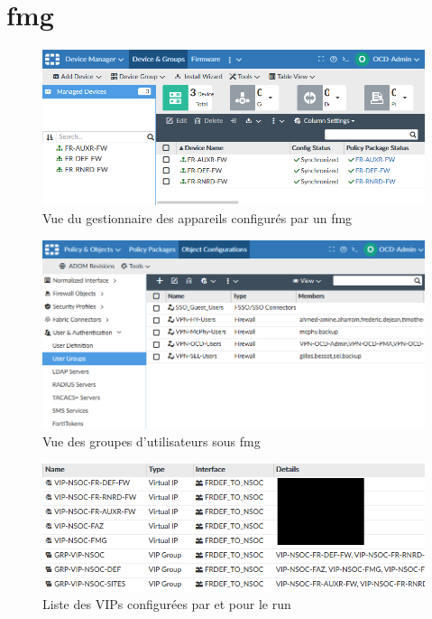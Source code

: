 \documentclass[12pt, oneside, a4paper, titlepage]{report}
\begin{document}
\section{\acrlong{fmg}}%
\label{sec:annexes::fmg}

\begin{figure}[h!]
    \centering
    \includegraphics[width = \linewidth]{img/fmg/device-manager.png}
    \caption{Vue du gestionnaire des appareils configurés par un \acrlong{fmg}}%
    \label{fig:fmg/device-manager.png}
\end{figure}

\begin{figure}[h!]
    \centering
    \includegraphics[width = \linewidth]{img/fmg/user-groups.png}
    \caption{Vue des groupes d'utilisateurs sous \acrlong{fmg}}%
    \label{fig:fmg/user-groups}
\end{figure}

\begin{figure}[h!]
    \centering
    \includegraphics[width = \linewidth]{img/fmg/vips.png}
    \caption{Liste des VIPs configurées par et pour le \gls{run}}%
    \label{fig:fmg/vips.png}
\end{figure}
\end{document}
